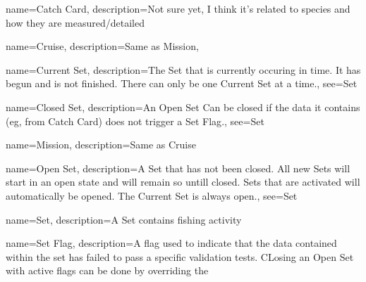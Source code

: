 \usepackage[nonumberlist]{glossaries}

\makenoidxglossaries

 {
  name=Catch Card,
  description={Not sure yet, I think it's related to species and how they are measured/detailed}
  }

 {
  name=Cruise,
  description={Same as \gls{Mission}},
  }

 {
  name=Current Set,
  description={The \gls{Set} that is currently occuring in time. It has begun and is not finished. There can only be one \gls{Current Set} at a time.},
  see={Set}
  }

 {
  name=Closed Set,
  description={An \gls{Open Set} Can be closed if the data it contains (eg, from \gls{Catch Card}) does not trigger a \gls{Set Flag}.},
  see={Set}
  }


 {
  name=Mission,
  description={Same as \gls{Cruise}}
  }

 {
  name=Open Set,
  description={A \gls{Set} that has not been closed. All new Sets will start in an open state and will remain so untill closed. Sets that are activated will automatically be opened. The \gls{Current Set} is always open.},
  see={Set}
  }

 {
  name=Set,
  description={A \gls{Set} contains fishing activity}
  }
  
 {
  name=Set Flag,
  description={A flag used to indicate that the data contained within the set has failed to pass a specific validation tests. CLosing an \gls{Open Set} with active flags can be done by overriding the }
  }
  
\glsaddall
\glsaddallunused
